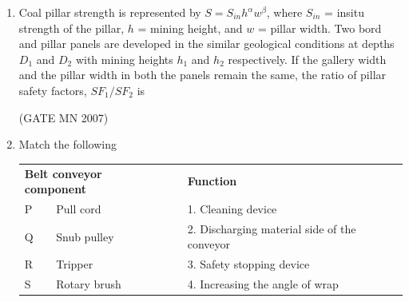 \documentclass[journal]{IEEEtran}
\begin{document}
\begin{enumerate}
\item Coal pillar strength is represented by $S = S_{in} h^\alpha w^\beta$, where $S_{in}$ = insitu strength of the pillar, $h$ = mining height, and $w$ = pillar width. Two bord and pillar panels are developed in the similar geological conditions at depths $D_1$ and $D_2$ with mining heights $h_1$ and $h_2$ respectively. If the gallery width and the pillar width in both the panels remain the same, the ratio of pillar safety factors, $SF_1/SF_2$ is

\begin{enumerate}
\end{enumerate}


\hfill (GATE MN 2007)

\item Match the following

\begin{tabular}{llcl}
\multicolumn{2}{l}{\textbf{Belt conveyor component}} & & \textbf{Function} \\
P & Pull cord      &  & 1. Cleaning device \\
Q & Snub pulley    &  & 2. Discharging material side of the conveyor \\
R & Tripper        &  & 3. Safety stopping device \\
S & Rotary brush   &  & 4. Increasing the angle of wrap \\
\end{tabular}




\begin{enumerate}
\end{enumerate}



\end{enumerate}
\end{document}
